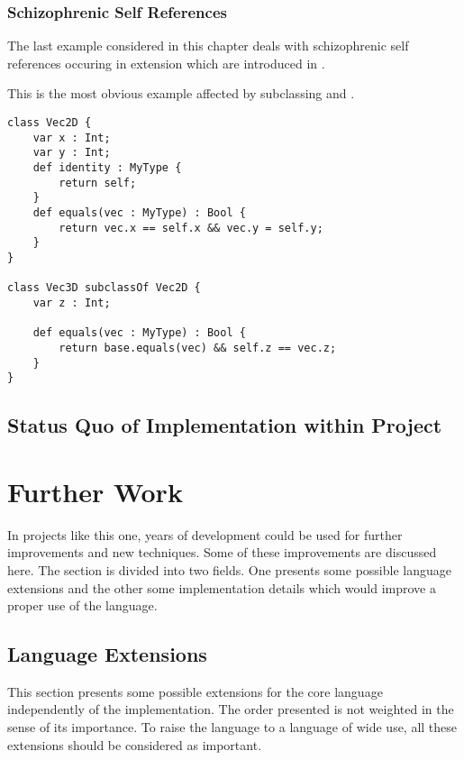 \subsubsection{Schizophrenic Self References}
The last example considered in this chapter deals with schizophrenic self
references occuring in extension which are introduced in .

This is the most obvious example affected by subclassing and \mytype.

\begin{lstlisting}[float=ht,language=ooplss,caption=Avoid schizophrenic self references with \mytype.,label=lst:solveSchizo]
class Vec2D {
	var x : Int;
	var y : Int;
	def identity : MyType {
		return self;
	}
	def equals(vec : MyType) : Bool {
		return vec.x == self.x && vec.y = self.y;
	}
}

class Vec3D subclassOf Vec2D {
	var z : Int;

	def equals(vec : MyType) : Bool {
		return base.equals(vec) && self.z == vec.z;
	}
}
\end{lstlisting}

\subsection{Status Quo of Implementation within Project}
\label{sec:statusQuo}

\section{Further Work}
\label{sec:futureWork}
In projects like this one, years of development could be used for
further improvements and new techniques. Some of these improvements are 
discussed here. The section is divided into two fields. One presents some
possible language extensions and the other some implementation details
which would improve a proper use of the language.

\subsection{Language Extensions}
This section presents some possible extensions for the core language
independently of the implementation. The order presented is not weighted
in the sense of its importance. To raise the language to a language
of wide use, all these extensions should be considered as important.

